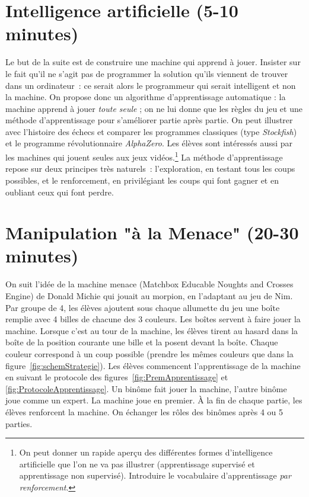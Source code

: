 \documentclass[a4paper,12pt]{article}
\begin{document}
\section{Intelligence artificielle (5-10 minutes)} \label{intelligence-artificielle-5-10-minutes}
\noindent Le but de la suite est de construire une machine qui apprend à jouer. Insister sur le fait qu'il ne s'agit pas de
programmer la solution qu'ils viennent de trouver dans un ordinateur~: ce serait alors le programmeur qui serait
intelligent et non la machine. On propose donc un algorithme d'apprentissage automatique : la machine apprend à jouer
\emph{toute seule} ; on ne lui donne que les règles du jeu et une méthode d'apprentissage pour s'améliorer partie après
partie. On peut illustrer avec l'histoire des échecs et comparer les programmes classiques (type \emph{Stockfish}) et le
programme révolutionnaire \emph{AlphaZero}. Les élèves sont intéressés aussi par les machines qui jouent seules aux jeux
vidéos.\footnote{On peut donner un rapide aperçu des différentes formes d'intelligence artificielle que l'on ne va pas
illustrer (apprentissage supervisé et apprentissage non supervisé). Introduire le vocabulaire d'apprentissage \emph{par renforcement}.}
%
La méthode d'apprentissage repose sur deux principes très naturels~: l'exploration, en testant tous les coups possibles, et le renforcement, en privilégiant les coups qui font gagner et en oubliant ceux qui font perdre.

\section{Manipulation "à la Menace" (20-30 minutes)}
\label{manipulation-uxe0-la-menace-20-30-minutes}
\noindent On suit l'idée de la machine {\sc menace} (Matchbox Educable Noughts and Crosses Engine) 
de Donald Michie \cite{Wiki, Michie} qui jouait au morpion, en l'adaptant au jeu de Nim.
%
Par groupe de 4, les élèves ajoutent sous chaque allumette du jeu une boîte remplie avec 4 billes de chacune des 3 couleurs. Les boîtes servent à faire jouer la machine. Lorsque c'est au tour de la machine, les élèves tirent au hasard dans la boîte de la position courante une bille et la posent devant la boîte. Chaque couleur correspond à un coup possible (prendre les mêmes couleurs que dans la figure~\ref{fig:schemStrategie}).
%
Les élèves commencent l'apprentissage de la machine en suivant le protocole des figures~\ref{fig:PremApprentissage} et \ref{fig:ProtocoleApprentissage}. 
Un binôme fait jouer la machine, l'autre binôme joue comme un expert. La machine joue en premier. À la fin de chaque partie, les élèves renforcent la machine. 
On échanger les rôles des binômes après  4 ou 5 parties.
\end{document}
